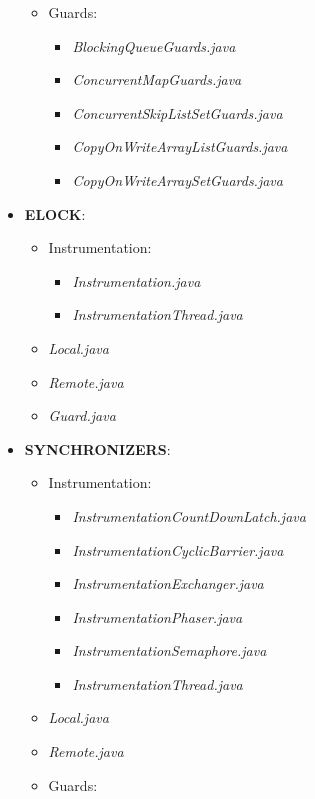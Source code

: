 \documentclass[]{usiinfthesis}
\begin{document}
\begin{itemize}
\begin{itemize}
        \item Guards:
        \begin{itemize}
            \item \textit{BlockingQueueGuards.java}
            \item \textit{ConcurrentMapGuards.java}
            \item \textit{ConcurrentSkipListSetGuards.java}
            \item \textit{CopyOnWriteArrayListGuards.java}
            \item \textit{CopyOnWriteArraySetGuards.java}
        \end{itemize}
    \end{itemize}
    \item \textbf{ELOCK}:
    \begin{itemize}
        \item Instrumentation:
        \begin{itemize}
            \item \textit{Instrumentation.java}
            \item \textit{InstrumentationThread.java}
        \end{itemize}
        \item \textit{Local.java}
        \item \textit{Remote.java}
        \item \textit{Guard.java}
    \end{itemize}
    \item \textbf{SYNCHRONIZERS}:
    \begin{itemize}
        \item Instrumentation:
        \begin{itemize}
            \item \textit{InstrumentationCountDownLatch.java}
            \item \textit{InstrumentationCyclicBarrier.java}
            \item \textit{InstrumentationExchanger.java}
            \item \textit{InstrumentationPhaser.java}
            \item \textit{InstrumentationSemaphore.java}
            \item \textit{InstrumentationThread.java}
        \end{itemize}
        \item \textit{Local.java}
        \item \textit{Remote.java}
        \item Guards:

\end{itemize}
\end{itemize}
\end{document}
